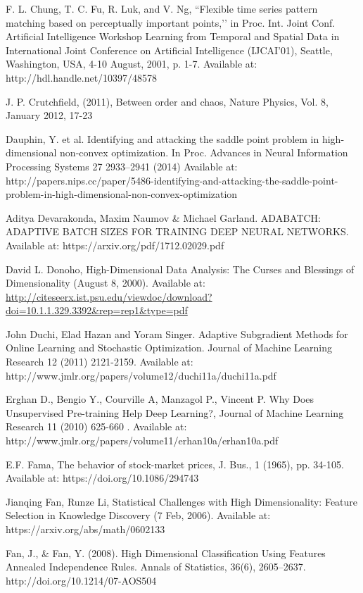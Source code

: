 \documentclass[a4paper,latin]{paper}
\begin{document}
\begin{thebibliography}{9}
 F. L. Chung, T. C. Fu, R. Luk, and V. Ng, “Flexible time series pattern matching based on perceptually important points,’’ in Proc. Int. Joint Conf. Artificial Intelligence Workshop  
 Learning from Temporal and Spatial Data in International Joint Conference on Artificial Intelligence (IJCAI'01), Seattle, Washington, USA, 4-10 August, 2001, p. 
 1-7. Available at: http://hdl.handle.net/10397/48578

J. P. Crutchfield, (2011), Between order and chaos, Nature Physics, Vol. 8, January 2012, 17-23

Dauphin, Y. et al. Identifying and attacking the saddle point problem in high-dimensional non-convex optimization. In Proc. Advances in Neural Information Processing Systems 27 2933–2941 (2014)
Available at: http://papers.nips.cc/paper/5486-identifying-and-attacking-the-saddle-point-problem-in-high-dimensional-non-convex-optimization 

Aditya Devarakonda, Maxim Naumov \& Michael Garland. ADABATCH: ADAPTIVE BATCH SIZES FOR TRAINING
DEEP NEURAL NETWORKS. Available at: https://arxiv.org/pdf/1712.02029.pdf

David L. Donoho, High-Dimensional Data Analysis: The Curses and Blessings of 
Dimensionality (August 8, 2000). Available at: \url{http://citeseerx.ist.psu.edu/viewdoc/download?doi=10.1.1.329.3392&rep=rep1&type=pdf}

John Duchi, Elad Hazan and Yoram Singer. Adaptive Subgradient Methods for
Online Learning and Stochastic Optimization. Journal of Machine Learning Research 12 (2011) 
2121-2159. Available at: http://www.jmlr.org/papers/volume12/duchi11a/duchi11a.pdf

Erghan D., Bengio Y., Courville A, Manzagol P., Vincent P. Why Does Unsupervised Pre-training Help Deep 
Learning?, Journal of Machine Learning Research 11 (2010) 625-660 . Available 
at: http://www.jmlr.org/papers/volume11/erhan10a/erhan10a.pdf

E.F. Fama, The behavior of stock-market prices, J. Bus., 1 (1965), pp. 34-105. 
Available at: https://doi.org/10.1086/294743

Jianqing Fan, Runze Li, 
Statistical Challenges with High Dimensionality: Feature Selection in Knowledge Discovery 
(7 Feb, 2006). Available at: https://arxiv.org/abs/math/0602133

Fan, J., \& Fan, Y. (2008). High Dimensional Classification Using Features Annealed Independence Rules. Annals of Statistics, 36(6), 2605–2637. http://doi.org/10.1214/07-AOS504


\end{thebibliography}
\end{document}
